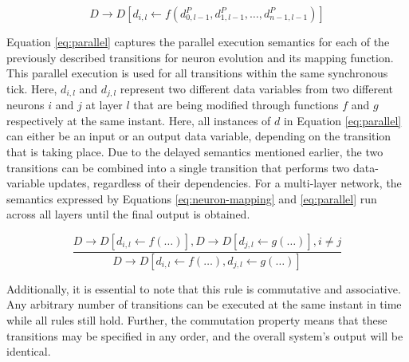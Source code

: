 \begin{equation}
    D \rightarrow D[d_{i,l} \leftarrow f(d_{0,l-1}^P, d_{1,l-1}^P, \dots, d_{n-1,l-1}^P)]
    \label{eq:neuron-mapping}
\end{equation}



Equation \ref{eq:parallel} captures the parallel execution semantics for each of the previously described transitions for neuron evolution and its mapping function. This parallel execution is used for all transitions within the same synchronous tick. Here, $d_{i,l}$ and $d_{j,l}$ represent two different data variables from two different neurons $i$ and $j$ at layer $l$ that are being modified through functions $f$ and $g$ respectively at the same instant. Here, all instances of $d$ in Equation \ref{eq:parallel} can either be an input or an output data variable, depending on the transition that is taking place. Due to the delayed semantics mentioned earlier, the two transitions can be combined into a single transition that performs two data-variable updates, regardless of their dependencies. For a multi-layer network, the semantics expressed by Equations \ref{eq:neuron-mapping} and \ref{eq:parallel} run across all layers until the final output is obtained.


\begin{equation}
    \frac{D \rightarrow D[d_{i,l} \leftarrow f(\dots)], D \rightarrow D[d_{j,l} \leftarrow g(\dots)], i \neq j}
    {D \rightarrow D[d_{i,l} \leftarrow f(\dots), d_{j,l} \leftarrow g(\dots)]}
    \label{eq:parallel}
\end{equation}



Additionally, it is essential to note that this rule is commutative and associative. Any arbitrary number of transitions can be executed at the same instant in time while all rules still hold.
Further, the commutation property means that these transitions may be specified in any order, and the overall system's output will be identical.



